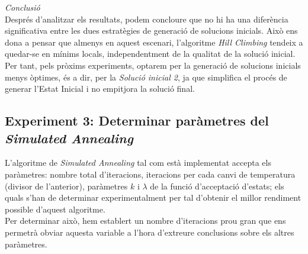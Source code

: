 \documentclass[a4paper]{article}
\begin{document}
	\textit{Conclusió} \\
	Després d'analitzar els resultats, podem concloure que no hi ha una diferència significativa entre les dues estratègies de generació de solucions inicials. Això ens dona a pensar que almenys en aquest escenari, l'algoritme \textit{Hill Climbing} tendeix a quedar-se en mínims locals, independentment de la qualitat de la solució inicial. Per tant, pels pròxims experiments, optarem per la generació de solucions inicials menys òptimes, és a dir, per la \textit{Solució inicial 2}, ja que simplifica el procés de generar l'Estat Inicial i no empitjora la solució final.\\
	
	\subsection{Experiment 3: Determinar paràmetres del \textit{Simulated Annealing}}

	L'algoritme de \textit{Simulated Annealing} tal com està implementat accepta els paràmetres: nombre total d'iteracions, iteracions per cada canvi de temperatura (divisor de l'anterior), paràmetres $k$ i $\lambda$ de la funció d'acceptació d'estats; els quals s'han de determinar experimentalment per tal d'obtenir el millor rendiment possible d'aquest algoritme.\\
	
	Per determinar això, hem establert un nombre d'iteracions prou gran que ens permetrà obviar aquesta variable a l'hora d'extreure conclusions sobre els altres paràmetres.\\
\end{document}
